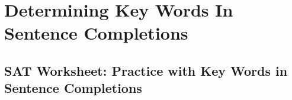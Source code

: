 \section{Determining Key Words In Sentence Completions}
\subsection{SAT Worksheet: Practice with Key Words in Sentence Completions}